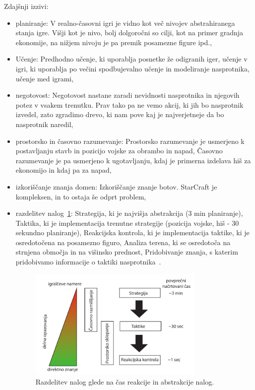 \documentclass[a4paper, 12pt]{book}
\begin{document}
Zdajšnji izzivi:
\begin{itemize}
	\item planiranje: V realno-časovni igri je vidno kot več nivojev abstrahiranega stanja igre. Višji kot je nivo, bolj dolgoročni so cilji, kot na primer gradnja ekonomije, na nižjem nivoju je pa premik posamezne figure ipd.,
	\item Učenje: Predhodno učenje, ki uporablja posnetke že odigranih iger, učenje v igri, ki uporablja po večini spodbujevalno učenje in modeliranje nasprotnika, učenje med igrami,
	\item negotovost: Negotovost nastane zaradi nevidnosti nasprotnika in njegovih potez v vsakem trenutku. Prav tako pa ne vemo akcij, ki jih bo nasprotnik izvedel, zato zgradimo drevo, ki nam pove kaj je najverjetneje da bo nasprotnik naredil,
	\item prostorsko in časovno razumevanje:
	Prostorsko razumevanje je usmerjeno k postavljanju stavb in pozicijo vojske za obrambo in napad,
	Časovno razumevanje je pa usmerjeno k ugotavljanju, kdaj je primerna izdelava hiš za ekonomijo in kdaj pa za napad,
	\item izkoriščanje znanja domen:
	Izkoriščanje znanje botov. StarCraft je kompleksen, in to ostaja še odprt problem,
	\item razdelitev nalog~\ref{picRazdelitevNalog}:
	Strategija, ki je najvišja abstrakcija (3 min planiranje),
	Taktika, ki je implementacija trenutne strategije (pozicija vojske, hiš - 30 sekundno planiranje),
	Reakcijska kontrola, ki je implementacija taktike, ki je osredotočena na posamezno figuro,
	Analiza terena, ki se osredotoča na strnjena območja in na višinsko prednost,
	Pridobivanje znanja, s katerim pridobivamo informacije o taktiki nasprotnika~\cite{survey_real_time_strategy_ai_research_starcraft}.
	
	\begin{figure}[h]
		\begin{center}
			\includegraphics[width=0.8\textwidth]{RazdelitevNalog.pdf}
		\end{center}
		\caption{Razdelitev nalog glede na čas reakcije in abstrakcije nalog.}
		\label{picRazdelitevNalog}
	\end{figure}
	

\end{itemize}
\end{document}
